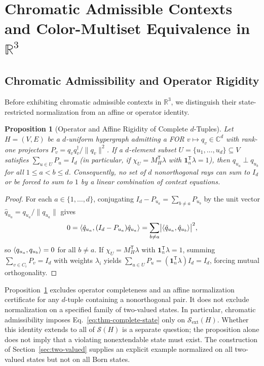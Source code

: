 \documentclass[aps,pra,reprint,superscriptaddress,longbibliography,nofootinbib,floatfix,10pt]{revtex4-2}
\newtheorem{proposition}[theorem]{Proposition}
\theoremstyle{definition}\newtheorem{definition}[theorem]{Definition}
\theoremstyle{remark}\newtheorem{remark}[theorem]{Remark}
\newcommand{\C}{\mathbb C}\newcommand{\R}{\mathbb R}\newcommand{\Q}{\mathbb Q}
\newcommand{\Sc}{\mathcal S}\newcommand{\Cc}{\mathcal C}\newcommand{\Wc}{\mathcal W}
\begin{document}
\section{Chromatic Admissible Contexts and Color-Multiset Equivalence in \texorpdfstring{$\R^3$}{R3}}\label{sec:complete-rainbow}

\subsection{Chromatic Admissibility and Operator Rigidity}\label{sec:no-go-operator}

Before exhibiting chromatic admissible contexts in $\R^3$, we distinguish their state-restricted normalization from an affine or operator identity.

\begin{proposition}[Operator and Affine Rigidity of Complete $d$-Tuples]\label{prop:no-operator-complete}
Let $H=(V,E)$ be a $d$-uniform hypergraph admitting a FOR $v\mapsto q_v\in\C^d$ with rank-one projectors $P_v=q_vq_v^\dagger/\|q_v\|^2$. If a $d$-element subset $U=\{u_1,\ldots,u_d\}\subseteq V$ satisfies $\sum_{u\in U}P_u=I_d$ (in particular, if $\chi_U=M_H^{\mathsf T}\lambda$ with $\mathbf{1}_n^{\mathsf T}\lambda=1$), then $q_{u_a}\perp q_{u_b}$ for all $1\le a<b\le d$. Consequently, no set of $d$ nonorthogonal rays can sum to $I_d$ or be forced to sum to $1$ by a linear combination of context equations.
\end{proposition}
\begin{proof}
For each $a\in\{1,\ldots,d\}$, conjugating $I_d-P_{u_a}=\sum_{b\neq a}P_{u_b}$ by the unit vector $\hat{q}_{u_a}=q_{u_a}/\|q_{u_a}\|$ gives
\[
0 = \langle \hat{q}_{u_a},(I_d-P_{u_a})\hat{q}_{u_a}\rangle = \sum_{b\neq a}\bigl|\langle \hat{q}_{u_a},\hat{q}_{u_b}\rangle\bigr|^2,
\]
so $\langle q_{u_a},q_{u_b}\rangle=0$ for all $b\neq a$. If $\chi_U=M_H^{\mathsf T}\lambda$ with $\mathbf{1}_n^{\mathsf T}\lambda=1$, summing $\sum_{v\in C_i}P_v=I_d$ with weights $\lambda_i$ yields $\sum_{u\in U}P_u=(\mathbf{1}_n^{\mathsf T}\lambda)I_d=I_d$, forcing mutual orthogonality.
\end{proof}

Proposition~\ref{prop:no-operator-complete} excludes operator completeness and an affine normalization certificate for any $d$-tuple containing a nonorthogonal pair. It does not exclude normalization on a specified family of two-valued states. In particular, chromatic admissibility imposes Eq.~\eqref{eq:thm-complete-state} only on $\Sc_{\mathrm{ext}}(H)$. Whether this identity extends to all of $\Sc(H)$ is a separate question; the proposition alone does not imply that a violating nonextendable state must exist. The construction of Section~\ref{sec:two-valued} supplies an explicit example normalized on all two-valued states but not on all Born states.
\end{document}
